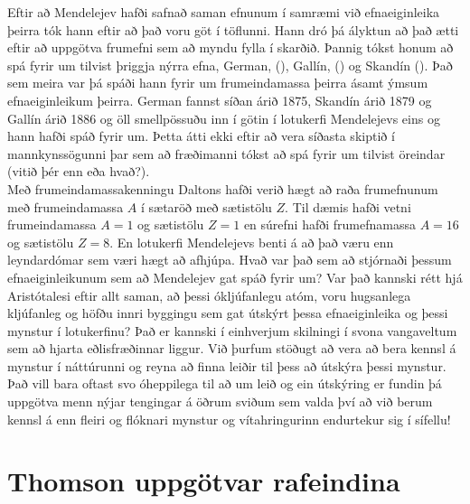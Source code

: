 Eftir að Mendelejev hafði safnað saman efnunum í samræmi við efnaeiginleika þeirra tók hann eftir að það voru göt í töflunni. Hann dró þá ályktun að það ætti eftir að uppgötva frumefni sem að myndu fylla í skarðið. Þannig tókst honum að spá fyrir um tilvist þriggja nýrra efna,  German, (), Gallín, () og Skandín (). Það sem meira var þá spáði hann fyrir um frumeindamassa þeirra ásamt ýmsum efnaeiginleikum þeirra. German fannst síðan árið 1875, Skandín árið 1879 og Gallín árið 1886 og öll smellpössuðu inn í götin í lotukerfi Mendelejevs eins og hann hafði spáð fyrir um. Þetta átti ekki eftir að vera síðasta skiptið í mannkynssögunni þar sem að fræðimanni tókst að spá fyrir um tilvist öreindar (vitið þér enn eða hvað?). \\

Með frumeindamassakenningu Daltons hafði verið hægt að raða frumefnunum með frumeindamassa $A$ í sætaröð með sætistölu $Z$. Til dæmis hafði vetni frumeindamassa $A = 1$ og sætistölu $Z = 1$ en súrefni hafði frumefnamassa $A = 16$ og sætistölu $Z = 8$. En lotukerfi Mendelejevs benti á að það væru enn leyndardómar sem væri hægt að afhjúpa. Hvað var það sem að stjórnaði þessum efnaeiginleikunum sem að Mendelejev gat spáð fyrir um?  Var það kannski rétt hjá Aristótalesi eftir allt saman, að þessi ókljúfanlegu atóm, voru hugsanlega kljúfanleg og höfðu innri byggingu sem gat útskýrt þessa efnaeiginleika og þessi mynstur í lotukerfinu? Það er kannski í einhverjum skilningi 
í svona vangaveltum sem að hjarta eðlisfræðinnar liggur. Við þurfum stöðugt að vera að bera kennsl á mynstur í náttúrunni og reyna að finna leiðir til þess að útskýra þessi mynstur. Það vill bara oftast svo óheppilega til að um leið og ein útskýring er fundin þá uppgötva menn nýjar tengingar á öðrum sviðum sem valda því að við berum kennsl á enn fleiri og flóknari mynstur og vítahringurinn endurtekur sig í sífellu! \\

\section{Thomson uppgötvar rafeindina}

